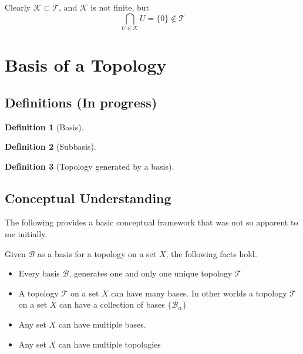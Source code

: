 \documentclass{article}
\theoremstyle{remark}
\theoremstyle{definition}
\newtheorem{definition}{Definition}[section]
\begin{document}
Clearly $\mathcal{K} \subset \mathcal{T}$, and $\mathcal{K}$ is not finite, but $$\bigcap_{U \in \mathcal{K}} U = \{0\} \not\in \mathcal{T}$$

\newpage


\section{Basis of a Topology}

\subsection{Definitions (In progress)}

\begin{definition}[Basis]

\end{definition}

\begin{definition}[Subbasis]

\end{definition}

\begin{definition}[Topology generated by a basis]

\end{definition}

\newpage


\subsection{Conceptual Understanding}

The following provides a basic conceptual framework that was not so apparent to me initially. 

\medskip

Given $\mathcal{B}$ as a basis for a topology on a set $X$, the following facts hold. 

\begin{itemize}
  \item Every basis $\mathcal{B}$, generates one and only one unique topology $\mathcal{T}$
  \item A topology $\mathcal{T}$ on a set $X$ can have many bases. In other worlds a topology $\mathcal{T}$ on a set $X$ can have a collection of bases $\{\mathcal{B_{\alpha}}\}$
  \item Any set $X$ can have multiple bases.
  \item Any set $X$ can have multiple topologies
\end{itemize}
\end{document}
